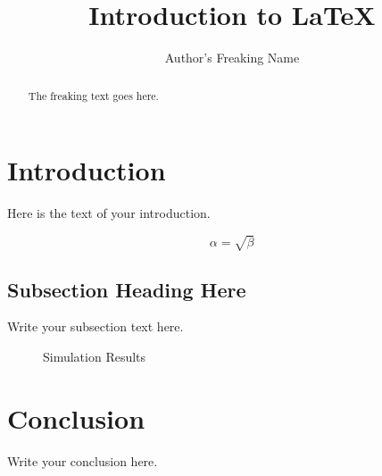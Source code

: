 \documentclass{article}
\begin{document}
\title{Introduction to \LaTeX{}}
\author{Author's Freaking Name}

\maketitle

\begin{abstract}
The freaking text goes here.
\end{abstract}

\section{Introduction}
Here is the text of your introduction.

\begin{equation}
    \label{simple_equation}
    \alpha = \sqrt{ \beta }
\end{equation}

\subsection{Subsection Heading Here}
Write your subsection text here.

\begin{figure}
    \centering
    \caption{Simulation Results}
    \label{simulationfigure}
\end{figure}

\section{Conclusion}
Write your conclusion here.
\end{document}
